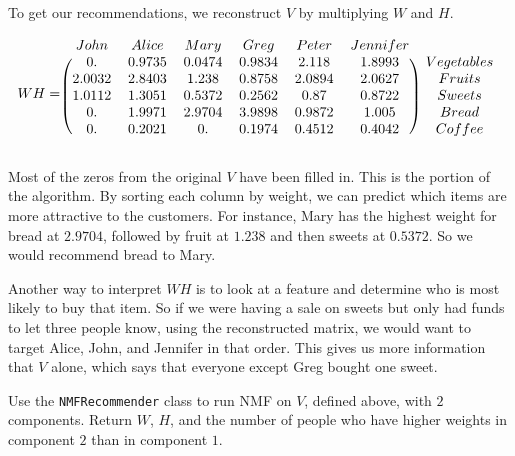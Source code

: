 To get our recommendations, we reconstruct $V$ by multiplying $W$ and $H$.

\[
WH =
\begin{blockarray}{ccccccc}
  John&  Alice  &Mary & Greg & Peter & Jennifer\\
  \begin{block}{(cccccc)c}
  0. &  0.9735 & 0.0474 & 0.9834 & 2.118 &   1.8993 &Vegetables\\
      2.0032 & 2.8403 & 1.238 & 0.8758 &  2.0894  &  2.0627 &Fruits\\
      1.0112 & 1.3051 &  0.5372 &  0.2562 &  0.87  &  0.8722 &Sweets\\
       0. & 1.9971 & 2.9704 & 3.9898 & 0.9872 &   1.005 &Bread\\
     0. & 0.2021 & 0. &  0.1974 & 0.4512  &  0.4042 &Coffee\\
   \end{block}
   \end{blockarray}
\]

Most of the zeros from the original $V$ have been filled in.
This is the  portion of the algorithm.
By sorting each column by weight, we can predict which items are more attractive to the customers.
For instance, Mary has the highest weight for bread at $2.9704$, followed by fruit at $1.238$ and then sweets at $0.5372$.
So we would recommend bread to Mary.

Another way to interpret $WH$ is to look at a feature and determine who is most likely to buy that item.
So if we were having a sale on sweets but only had funds to let three people know, using the reconstructed matrix, we would want to target Alice, John, and Jennifer in that order.
This gives us more information that $V$ alone, which says that everyone except Greg bought one sweet.

\begin{problem}
Use the \texttt{NMFRecommender}  class to run NMF on $V$, defined above, with $2$ components.
Return $W$, $H$, and the number of people who have higher weights in component $2$ than in component $1$.
\end{problem}

